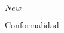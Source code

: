 \documentclass[../Main/main]{subfiles}
\begin{document}
\unit{ $ New $ }
{

	
	
	
	


	


	
	

	


	
	
	
	
	
	
	
	Conformalidad \\

	
	
	
	
	
	
	
	
	
	
	
	
	

	

	
	
	
	
	
	
	
	
	
	


	
	
	
	
	
	
	



}
\end{document}
